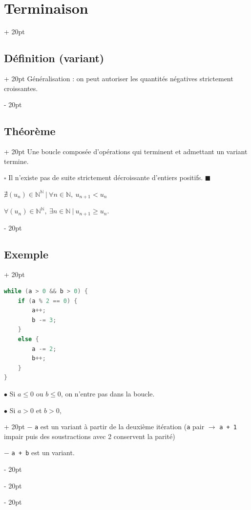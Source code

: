 \documentclass[a4paper, 12pt, twoside]{article}
\newcommand{\N}{\mathbb{N}} %
\renewcommand{\le}{\leqslant}
\renewcommand{\ge}{\geqslant}
\newcommand{\ind}[1][20pt]{\advance\leftskip + #1}
\newcommand{\deind}[1][20pt]{\advance\leftskip - #1}
\newenvironment{indentedenv}[1][20pt]{\par \ind[#1]}{\par \deind}
\newenvironment{indt}[2][20pt]{#2 \begin{indentedenv}[#1]}{\end{indentedenv}} %
\begin{document}
\begin{indt}{\section{Terminaison}}
\begin{indt}{\subsection{Définition (variant)}}
            Généralisation : on peut autoriser les quantités négatives strictement croissantes.
        \end{indt}
        
        \vspace{6pt}
        
        \begin{indt}{\subsection{Théorème}}
            Une boucle composée d'opérations qui terminent et admettant un variant termine.
            
            $\square$ Il n'existe pas de suite strictement décroissante d'entiers positifs. $\blacksquare$
            
            $\nexists (u_n) \in \N^\N \ |\ \forall n \in \N,\ u_{n + 1} < u_n$
            
            $\forall (u_n) \in \N^\N,\ \exists n \in \N\ |\ u_{n + 1} \ge u_n$.
        \end{indt}
        
        \vspace{6pt}
        
        \begin{indt}{\subsection{Exemple}}
            \begin{lstlisting}[language=C, xleftmargin=60pt]
while (a > 0 && b > 0) {
    if (a % 2 == 0) {
        a++;
        b -= 3;
    }
    else {
        a -= 2;
        b++;
    }
}\end{lstlisting}
            
            $\bullet$ Si $a \le 0$ ou $b \le 0$, on n'entre pas dans la boucle.
            
            \begin{indt}{$\bullet$ Si $a > 0$ et $b > 0$,}
            $-$ \texttt a est un variant à partir de la deuxième itération (\texttt a pair $\rightarrow$ \texttt{a + 1} impair puis des soustractions avec 2 conservent la parité)
            
            $-$ \texttt{a + b} est un variant.
            \end{indt}
        \end{indt}
        
        \vspace{6pt}
        

\end{indt}
\end{document}

